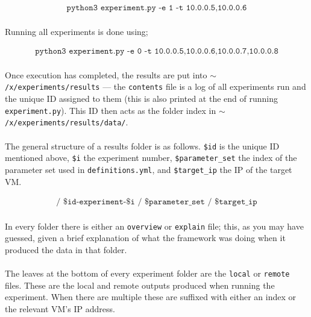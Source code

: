 \documentclass[a4paper,10pt]{article}
\begin{document}
\vspace{-4mm}
\begin{align*}
    \texttt{python3 experiment.py -e 1 -t 10.0.0.5,10.0.0.6}
\end{align*}

\paragraph{} Running all experiments is done using;

\vspace{-4mm}
\begin{align*}
    \texttt{python3 experiment.py -e 0 -t 10.0.0.5,10.0.0.6,10.0.0.7,10.0.0.8}
\end{align*}

\paragraph{} Once execution has completed, the results are put into \texttt{$\sim$/x/experiments/results} --- the \texttt{contents} file is a log of all experiments run and the unique ID assigned to them (this is also printed at the end of running \texttt{experiment.py}). This ID then acts as the folder index in \texttt{$\sim$/x/experiments/results/data/}.

\paragraph{} The general structure of a results folder is as follows. \texttt{\$id} is the unique ID mentioned above, \texttt{\$i} the experiment number, \texttt{\$parameter\_set} the index of the parameter set used in \texttt{definitions.yml}, and \texttt{\$target\_ip} the IP of the target VM.

\vspace{-4mm}
\begin{align*}
    \texttt{/ \$id-experiment-\$i / \$parameter\_set / \$target\_ip}
\end{align*}

\paragraph{} In every folder there is either an \texttt{overview} or \texttt{explain} file; this, as you may have guessed, given a brief explanation of what the framework was doing when it produced the data in that folder.

\paragraph{} The leaves at the bottom of every experiment folder are the \texttt{local} or \texttt{remote} files. These are the local and remote outputs produced when running the experiment. When there are multiple these are suffixed with either an index or the relevant VM's IP address.
\end{document}
